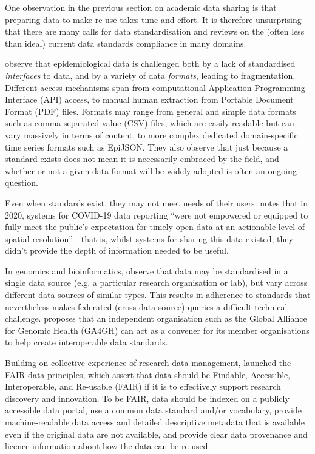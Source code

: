 \documentclass{CUP-JNL-DAP}%
\begin{document}
One observation in the previous section on academic data sharing is that preparing data to make re-use takes time and effort. It is therefore unsurprising that there are many calls for data standardisation and reviews on the (often less than ideal) current data standards compliance in many domains.  

\cite{fairchild_epidemiological_2018} observe that epidemiological data is challenged both by a lack of standardised \textit{interfaces} to data, and by a variety of data \textit{formats}, leading to fragmentation. Different access mechanisms span from computational Application Programming Interface (API) access, to manual human extraction from Portable Document Format (PDF) files. Formats may range from general and simple data formats such as comma separated value (CSV) files, which are easily readable but can vary massively in terms of content, to more complex dedicated domain-specific time series formats such as EpiJSON. They also observe that just because a standard exists does not mean it is necessarily embraced by the field, and whether or not a given data format will be widely adopted is often an ongoing question. 

Even when standards exist, they may not meet needs of their users. \cite{gardner_need_2021} notes that in 2020, systems for COVID-19 data reporting \enquote{were not empowered or equipped to fully meet the public's expectation for timely open data at an actionable level of spatial resolution} - that is, whilst systems for sharing this data existed, they didn't provide the depth of information needed to be useful. 

In genomics and bioinformatics, \cite{thorogood_international_2021} observe that data may be standardised in a single data source (e.g. a particular research organisation or lab), but vary across different data sources of similar types. This results in adherence to standards that nevertheless makes federated (cross-data-source) queries a difficult technical challenge. \cite{thorogood_international_2021} proposes that an independent organisation such as the Global Alliance for Genomic Health (GA4GH) can act as a convener for its member organisations to help create interoperable data standards. 

Building on collective experience of research data management, \cite{wilkinson_fair_2016} launched the FAIR data principles, which assert that data should be Findable, Accessible, Interoperable, and Re-usable (FAIR) if it is to effectively support research discovery and innovation. To be FAIR, data should be indexed on a publicly accessible data portal, use a common data standard and/or vocabulary, provide machine-readable data access and detailed descriptive metadata that is available even if the original data are not available, and provide clear data provenance and licence information about how the data can be re-used. 
\end{document}
